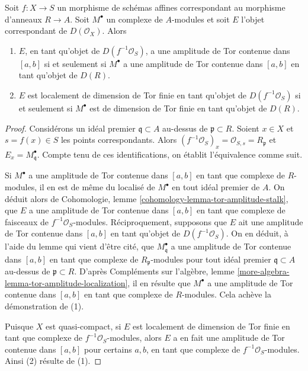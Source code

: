 \begin{lemma}
\label{lemma-tor-dimension-rel-affine}
Soit $f : X \to S$ un morphisme de schémas affines correspondant
au morphisme d'anneaux $R \to A$. Soit $M^\bullet$ un
complexe de $A$-modules et soit $E$ l'objet correspondant
de $D(\mathcal{O}_X)$. Alors
\begin{enumerate}
\item $E$, en tant qu'objet de $D(f^{-1}\mathcal{O}_S)$, a une amplitude de Tor contenue dans
$[a, b]$ si et seulement si $M^\bullet$ a une amplitude de Tor contenue dans $[a, b]$
en tant qu'objet de $D(R)$.
\item $E$ est localement de dimension de Tor finie en tant qu'objet de
$D(f^{-1}\mathcal{O}_S)$ si et seulement si $M^\bullet$
est de dimension de Tor finie en tant qu'objet de $D(R)$.
\end{enumerate}
\end{lemma}

\begin{proof}
Considérons un idéal premier $\mathfrak q \subset A$ au-dessus de $\mathfrak p \subset R$.
Soient $x \in X$ et $s = f(x) \in S$ les points correspondants.
Alors $(f^{-1}\mathcal{O}_S)_x = \mathcal{O}_{S, s} = R_\mathfrak p$
et $E_x = M^\bullet_\mathfrak q$. Compte tenu de ces identifications, on établit
l'équivalence comme suit.

\medskip\noindent
Si $M^\bullet$ a une amplitude de Tor contenue dans $[a, b]$ en tant que complexe de $R$-modules,
il en est de même du localisé de $M^\bullet$ en tout idéal premier de $A$.
On déduit alors de
Cohomologie, lemme \ref{cohomology-lemma-tor-amplitude-stalk},
que $E$ a une amplitude de Tor contenue dans $[a, b]$ en tant que complexe de faisceaux
de $f^{-1}\mathcal{O}_S$-modules.
Réciproquement, supposons que $E$ ait une amplitude de Tor contenue dans $[a, b]$
en tant qu'objet de $D(f^{-1}\mathcal{O}_S)$.
On en déduit, à l'aide du lemme qui vient d'être cité, que
$M^\bullet_\mathfrak q$ a une amplitude de Tor contenue dans $[a, b]$
en tant que complexe de $R_\mathfrak p$-modules pour tout
idéal premier $\mathfrak q \subset A$ au-dessus de $\mathfrak p \subset R$.
D'après Compléments sur l'algèbre, lemme \ref{more-algebra-lemma-tor-amplitude-localization},
il en résulte que $M^\bullet$ a une amplitude de Tor contenue dans $[a, b]$
en tant que complexe de $R$-modules.
Cela achève la démonstration de (1).

\medskip\noindent
Puisque $X$ est quasi-compact, si $E$ est localement de dimension de Tor finie
en tant que complexe de $f^{-1}\mathcal{O}_S$-modules, alors $E$
a en fait une amplitude de Tor contenue dans $[a, b]$ pour certains $a, b$, en tant que complexe de
$f^{-1}\mathcal{O}_S$-modules. Ainsi (2) résulte de (1).
\end{proof}

